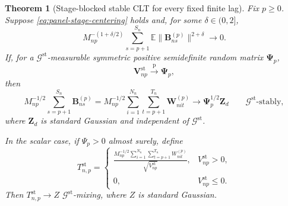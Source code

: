 \documentclass[11pt]{article}
\renewcommand\vec[1]{\boldsymbol{#1}}
\newcommand\mat[1]{\mathbf{#1}}
\newcommand{\E}{\mathbb{E}}
\newcommand{\G}{\mathcal{G}}
\newcommand{\pconverge}{\overset{\mathrm{p}}{\to}}
\newtheorem{theorem}{Theorem}
\theoremstyle{definition}
\begin{document}
\begin{theorem}[Stage-blocked stable CLT for every fixed finite lag]
\label{thm:panel-stage-block-clt}
Fix \(p\geq0\).
Suppose \eqref{eq:panel-stage-centering} holds and, for some \(\delta\in(0,2]\),
\begin{equation}\label{eq:panel-block-moment}
M_{np}^{-(1+\delta/2)}
\sum_{s=p+1}^{S_n}\E\|\vec B^{(p)}_{ns}\|^{2+\delta}
\longrightarrow0.
\end{equation}
If, for a \(\G^{\mathrm{st}}\)-measurable symmetric positive semidefinite random matrix \(\mat\Psi_p\),
\begin{equation}\label{eq:panel-block-variance-convergence}
\mat V_{np}^{\mathrm{st}}\pconverge\mat\Psi_p,
\end{equation}
then
\[
M_{np}^{-1/2}\sum_{s=p+1}^{S_n}\vec B^{(p)}_{ns}
=
M_{np}^{-1/2}\sum_{i=1}^{N_n}\sum_{t=p+1}^{T_n}\vec W^{(p)}_{nit}
\longrightarrow
\mat\Psi_p^{1/2}\vec Z_d
\qquad \G^{\mathrm{st}}\text{-stably},
\]
where \(\vec Z_d\) is standard Gaussian and independent of \(\G^{\mathrm{st}}\).

In the scalar case, if \(\Psi_p>0\) almost surely, define
\[
T_{n,p}^{\mathrm{st}}
=
\begin{cases}
\displaystyle
\frac{M_{np}^{-1/2}
\sum_{i=1}^{N_n}\sum_{t=p+1}^{T_n}W^{(p)}_{nit}}
{\sqrt{V_{np}^{\mathrm{st}}}},
&V_{np}^{\mathrm{st}}>0,\\[3mm]
0,&V_{np}^{\mathrm{st}}\leq0.
\end{cases}
\]
Then \(T_{n,p}^{\mathrm{st}}\to Z\) \(\G^{\mathrm{st}}\)-mixing, where \(Z\) is standard Gaussian.
\end{theorem}
\end{document}
